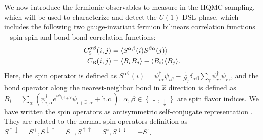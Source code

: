 \documentclass[aps,prl,twocolumn,superscriptaddress,showpacs,longbibliography]{revtex4-2}
\newcommand{\hatx}{\hat{x}}
\newcommand{\tx}[1]{\textmd{#1}}
\newcommand{\leftc}{\left\{ }
\newcommand{\rightc}{\right\} }
\begin{document}

\vspace{3mm}

We now introduce the fermionic observables to measure in the HQMC sampling, which will be used to characterize and detect the $U(1)$ DSL phase, 
which includes the following two gauge-invariant fermion bilinears correlation functions -- spin-spin and bond-bond correlation functions:
\begin{align}
C_\tx{S}^{\alpha \beta}(i, j) &=\langle
S^{\alpha\beta}(i)S^{\beta\alpha}(j)\rangle  \label{eq:eq29}
\\
C_\tx{B}(i, j) &=\langle B_{i}B_{j}\rangle-\langle B_{i}\rangle\langle B_{j} \rangle. \label{eq:eq30}
\end{align}
Here, the spin operator is defined as
$
    S^{\alpha\beta}(i)=\psi_{i\alpha}^{\dagger}\psi_{i\beta}-\frac{1}{N_{f}}\delta_{\alpha\beta}\sum_{\gamma}\psi_{i\gamma}^{\dagger}\psi_{i\gamma}
$,
and the bond operator  along the nearest-neighbor bond in $\hat{x}$ direction is defined as 
$
    B_{i}=\sum_{\alpha}(\psi^{\dagger}_{i,\alpha}e^{i \phi_{i, i+\hatx}} \psi_{i+\hat{x},\alpha}+\text{h.c.})
$.
$\alpha, \beta \in \leftc\uparrow, \downarrow\rightc$ are spin flavor indices. We have written the spin operators as antisymmetric self-conjugate representation \cite{Hermele2004}. They are related to the normal spin operators definition as $S^{\uparrow\downarrow} = S^+, S^{\downarrow\uparrow} = S^-,S^{\uparrow\uparrow} = S^{z}, S^{\downarrow\downarrow} = -S^{z}$.
\end{document}
